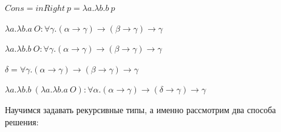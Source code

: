 \documentclass[12pt]{article}
\begin{document}
$Cons = inRight\ p = \lambda a. \lambda b. b\ p$

$\lambda a. \lambda b. a\ O : \forall \gamma .(\alpha \rightarrow \gamma) \rightarrow (\beta \rightarrow \gamma) \rightarrow \gamma$

$\lambda a. \lambda b. b\ O: \forall \gamma .(\alpha \rightarrow \gamma) \rightarrow (\beta \rightarrow \gamma) \rightarrow \gamma$

$\delta = \forall \gamma .(\alpha \rightarrow \gamma) \rightarrow (\beta \rightarrow \gamma) \rightarrow \gamma$

$\lambda a. \lambda b. b\ (\lambda a. \lambda b. a\ O) : \forall \alpha. (\alpha \rightarrow \gamma) \rightarrow (\delta \rightarrow \gamma) \rightarrow \gamma$


\vspace{5mm}
Научимся задавать рекурсивные типы, а именно рассмотрим два способа решения:
\end{document}
